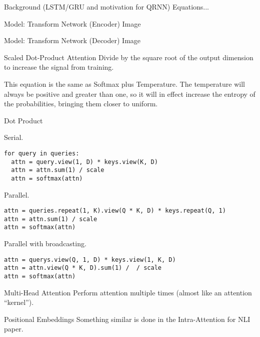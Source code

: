 \documentclass{beamer}
\begin{document}
\begin{frame}{Background (LSTM/GRU and motivation for QRNN)}{}
Equations...
\end{frame}

\begin{frame}{Model: Transform Network (Encoder)}{}
Image
\end{frame}

\begin{frame}{Model: Transform Network (Decoder)}{}
Image
\end{frame}

\begin{frame}[fragile]{Scaled Dot-Product Attention}{}
Divide by the square root of the output dimension to increase the signal from training.

This equation is the same as Softmax plus Temperature. The temperature will always be positive and greater than one, so it will in effect increase the entropy of the probabilities, bringing them closer to uniform.
\end{frame}

\begin{frame}[fragile]{Dot Product}

Serial.

\begin{verbatim}
for query in queries:
  attn = query.view(1, D) * keys.view(K, D)
  attn = attn.sum(1) / scale
  attn = softmax(attn)
\end{verbatim}

Parallel.

\begin{verbatim}
attn = queries.repeat(1, K).view(Q * K, D) * keys.repeat(Q, 1)
attn = attn.sum(1) / scale
attn = softmax(attn)
\end{verbatim}

Parallel with broadcasting.

\begin{verbatim}
attn = querys.view(Q, 1, D) * keys.view(1, K, D)
attn = attn.view(Q * K, D).sum(1) /  / scale
attn = softmax(attn)
\end{verbatim}
\end{frame}

\begin{frame}{Multi-Head Attention}{}
Perform attention multiple times (almost like an attention ``kernel'').
\end{frame}

\begin{frame}{Positional Embeddings}{}
Something similar is done in the Intra-Attention for NLI paper.
\end{frame}
\end{document}
